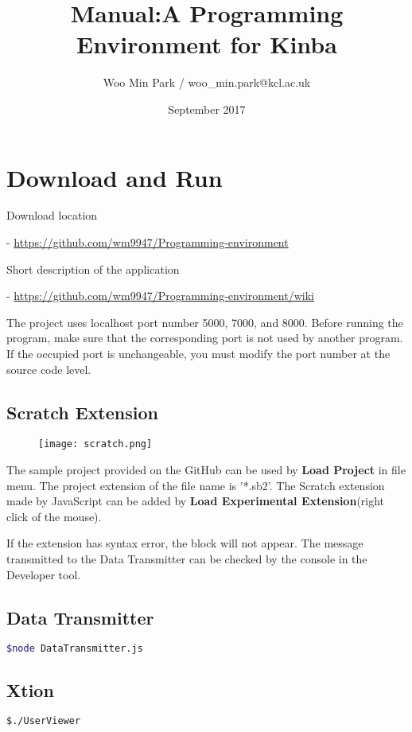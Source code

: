 \documentclass{article}
\title{Manual:A Programming Environment for Kinba}
\author{Woo Min Park / woo\_min.park@kcl.ac.uk }
\date{September 2017}
\begin{document}
\maketitle


\section*{Download and Run}

\noindent Download location 

 - \url{https://github.com/wm9947/Programming-environment}
 

\noindent Short description of the application

 - \url{https://github.com/wm9947/Programming-environment/wiki}

The project uses localhost port number 5000, 7000, and 8000.
Before running the program, make sure that the corresponding port is not used by another program. If the occupied port is unchangeable, you must modify the port number at the source code level.

\subsection*{Scratch Extension}

\begin{figure}[!ht]
\centering
\texttt{[image: scratch.png]}
\end{figure}

The sample project provided on the GitHub can be used by \textbf{Load Project} in file menu.
The project extension of the file name is '*.sb2'.
The Scratch extension made by JavaScript can be added by \textbf{Load Experimental Extension}(right click of the mouse).

If the extension has syntax error, the block will not appear.
The message transmitted to the Data Transmitter can be checked by the console in the Developer tool.


\subsection*{Data Transmitter}

\begin{lstlisting}[language=bash]
  $node DataTransmitter.js
\end{lstlisting}

\subsection*{Xtion}
\begin{lstlisting}[language=bash]
  $./UserViewer
\end{lstlisting}
\end{document}

